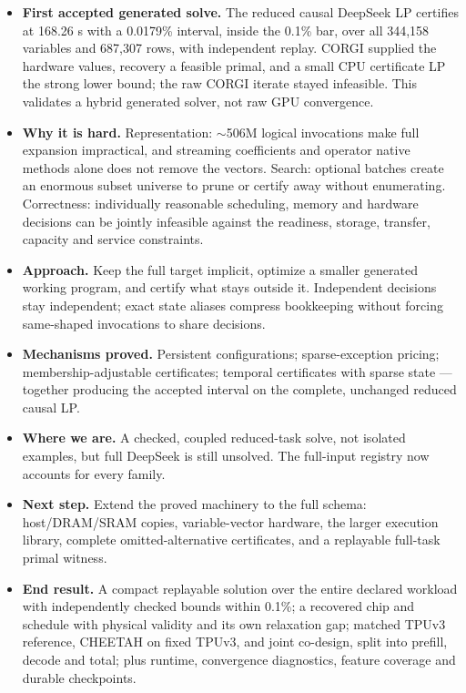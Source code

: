 \documentclass[10pt]{article}
\newenvironment{tight}
  {\begin{itemize}[leftmargin=13pt,itemsep=4pt,topsep=4pt,parsep=0pt,
     label=\textcolor{ink3}{\footnotesize$\bullet$}]\color{ink2}}
  {\end{itemize}}
\begin{document}
\begin{tight}
\item \textbf{\color{ink}First accepted generated solve.} The reduced causal
DeepSeek LP certifies at 168.26 s with a 0.0179\% interval, inside the 0.1\% bar,
over all 344,158 variables and 687,307 rows, with independent replay. CORGI
supplied the hardware values, recovery a feasible primal, and a small CPU
certificate LP the strong lower bound; the raw CORGI iterate stayed infeasible.
This validates a hybrid generated solver, not raw GPU convergence.
\item \textbf{\color{ink}Why it is hard.} Representation: $\sim$506M logical
invocations make full expansion impractical, and streaming coefficients and operator native methods alone does
not remove the vectors. Search: optional batches create an enormous subset universe
to prune or certify away without enumerating. Correctness: individually reasonable
scheduling, memory and hardware decisions can be jointly infeasible against the
readiness, storage, transfer, capacity and service constraints.
\item \textbf{\color{ink}Approach.} Keep the full target implicit, optimize a
smaller generated working program, and certify what stays outside it. Independent
decisions stay independent; exact state aliases compress bookkeeping without forcing
same-shaped invocations to share decisions.
\item \textbf{\color{ink}Mechanisms proved.} Persistent configurations;
sparse-exception pricing; membership-adjustable certificates; temporal certificates
with sparse state --- together producing the accepted interval on the complete,
unchanged reduced causal LP.
\item \textbf{\color{ink}Where we are.} A checked, coupled reduced-task solve, not
isolated examples, but full DeepSeek is still unsolved. The full-input registry now
accounts for every family.
\item \textbf{\color{ink}Next step.} Extend the proved machinery to the full schema:
host/DRAM/SRAM copies, variable-vector hardware, the larger execution library,
complete omitted-alternative certificates, and a replayable full-task primal
witness. 
\item \textbf{\color{ink}End result.} A compact replayable solution over the entire
declared workload with independently checked bounds within 0.1\%; a recovered chip
and schedule with physical validity and its own relaxation gap; matched TPUv3
reference, CHEETAH on fixed TPUv3, and joint co-design, split into prefill, decode
and total; plus runtime, convergence diagnostics, feature coverage and durable
checkpoints.
\end{tight}
\end{document}
